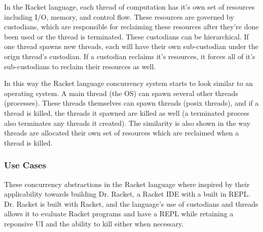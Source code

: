 \documentclass{article}
\begin{document}
In the Racket language, each thread of computation has it's
own set of resources including I/O, memory, and control flow. These
resources are governed by custodians, which are responsible for
reclaiming these resources after they're done been used or the
thread is terminated. These custodians can be hierarchical. If one
thread spawns new threads, each will have their own sub-custodian
under the orign thread's custodian. If a custodian reclaims it's
resources, it forces all of it's sub-custodians to reclaim their
resources as well.
\cite{KillSafe}

In this way the Racket language concurrency system starts to look
similar to an operating system. A main thread (the OS) can spawn
several other threads (processes). These threads themselves can
spawn threads (posix threads), and if a thread is killed, the
threads it spawned are killed as well (a terminated process also
terminates any threads it created). The similarity is also shown
in the way threads are allocated their own set of resources which
are reclaimed when a thread is killed.

\subsubsection{Use Cases}
These concurrency abstractions in the Racket language where inspired
by their applicability towards building Dr. Racket, a Racket IDE
with a built in REPL. Dr. Racket is built with Racket, and the
language's use of custodians and threads allows it to evaluate
Racket programs and have a REPL while retaining a reponsive UI and
the ability to kill either when necessary.
\cite{LispMachine, KillSafe}

\nocite{*}
\printbibliography
\end{document}
